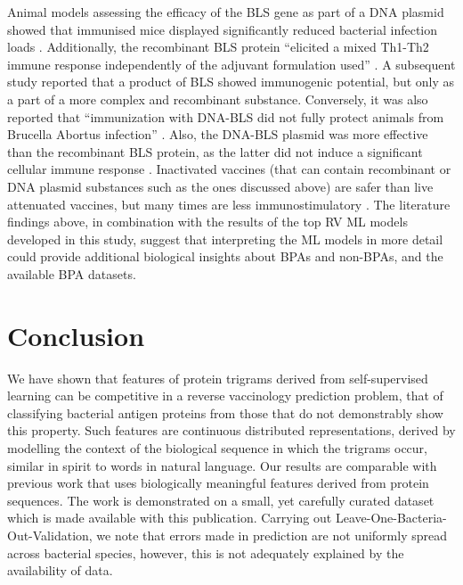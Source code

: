 \documentclass[10pt,journal,compsoc,twoside]{IEEEtran}
\begin{document}
Animal models assessing the efficacy of the BLS gene as part of a DNA plasmid showed that immunised mice displayed significantly reduced bacterial infection loads \cite{velikovsky_goldbaum_bowden_2002}. Additionally, the recombinant BLS protein “elicited a mixed Th1-Th2 immune response independently of the adjuvant formulation used” \cite{velikovsky_goldbaum_bowden_2003}. A subsequent study \cite{laplagne_2004} reported that a product of BLS showed immunogenic potential, but only as a part of a more complex and recombinant substance. Conversely, it was also reported that “immunization with DNA-BLS did not fully protect animals from Brucella Abortus infection” \cite{velikovsky_goldbaum_bowden_2002}. Also, the DNA-BLS plasmid was more effective than the recombinant BLS protein, as the latter did not induce a significant cellular immune response \cite{velikovsky_goldbaum_bowden_2002}. Inactivated vaccines (that can contain recombinant or DNA plasmid substances such as the ones discussed above) are safer than live attenuated vaccines, but many times are less immunostimulatory  \cite{vaccine-immunology_fundamentals}. The literature findings above, in combination with the results of the top RV ML models developed in this study, suggest that interpreting the ML models in more detail could provide additional biological insights about BPAs and non-BPAs, and the available BPA datasets.
 

\section{Conclusion}

We have shown that features of protein trigrams derived from self-supervised learning can be competitive in a reverse vaccinology prediction problem, that of classifying bacterial antigen proteins from those that do not demonstrably show this property. Such features are continuous distributed representations, derived by modelling the context of the biological sequence in which the trigrams occur, similar in spirit to words in natural language. Our results are comparable with previous work that uses biologically meaningful features derived from protein sequences. The work is demonstrated on a small, yet carefully curated dataset which is made available with this publication. Carrying out Leave-One-Bacteria-Out-Validation, we note that errors made in prediction are not uniformly spread across bacterial species, however, this is not adequately explained by the availability of data. 
\end{document}

